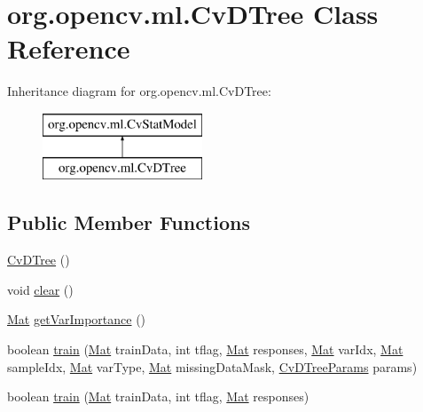 \hypertarget{classorg_1_1opencv_1_1ml_1_1_cv_d_tree}{}\section{org.\+opencv.\+ml.\+Cv\+D\+Tree Class Reference}
\label{classorg_1_1opencv_1_1ml_1_1_cv_d_tree}
Inheritance diagram for org.\+opencv.\+ml.\+Cv\+D\+Tree\+:\begin{figure}[H]
\begin{center}
\leavevmode
\includegraphics[height=2.000000cm]{classorg_1_1opencv_1_1ml_1_1_cv_d_tree}
\end{center}
\end{figure}
\subsection*{Public Member Functions}
\begin{DoxyCompactItemize}
\item 
\mbox{\hyperlink{classorg_1_1opencv_1_1ml_1_1_cv_d_tree_a54af605708ba8f89b971a9c66b28d935}{Cv\+D\+Tree}} ()
\item 
void \mbox{\hyperlink{classorg_1_1opencv_1_1ml_1_1_cv_d_tree_afd767fc87e8e0e8d8f819738f7fd4609}{clear}} ()
\item 
\mbox{\hyperlink{classorg_1_1opencv_1_1core_1_1_mat}{Mat}} \mbox{\hyperlink{classorg_1_1opencv_1_1ml_1_1_cv_d_tree_aed7572127077a57ce1f9940a439b220b}{get\+Var\+Importance}} ()
\item 
boolean \mbox{\hyperlink{classorg_1_1opencv_1_1ml_1_1_cv_d_tree_a5ef591dfad7f9021a49f8aca9848f6d5}{train}} (\mbox{\hyperlink{classorg_1_1opencv_1_1core_1_1_mat}{Mat}} train\+Data, int tflag, \mbox{\hyperlink{classorg_1_1opencv_1_1core_1_1_mat}{Mat}} responses, \mbox{\hyperlink{classorg_1_1opencv_1_1core_1_1_mat}{Mat}} var\+Idx, \mbox{\hyperlink{classorg_1_1opencv_1_1core_1_1_mat}{Mat}} sample\+Idx, \mbox{\hyperlink{classorg_1_1opencv_1_1core_1_1_mat}{Mat}} var\+Type, \mbox{\hyperlink{classorg_1_1opencv_1_1core_1_1_mat}{Mat}} missing\+Data\+Mask, \mbox{\hyperlink{classorg_1_1opencv_1_1ml_1_1_cv_d_tree_params}{Cv\+D\+Tree\+Params}} params)
\item 
boolean \mbox{\hyperlink{classorg_1_1opencv_1_1ml_1_1_cv_d_tree_aa103faf2c87ec041d47ca91baac899b7}{train}} (\mbox{\hyperlink{classorg_1_1opencv_1_1core_1_1_mat}{Mat}} train\+Data, int tflag, \mbox{\hyperlink{classorg_1_1opencv_1_1core_1_1_mat}{Mat}} responses)
\end{DoxyCompactItemize}
